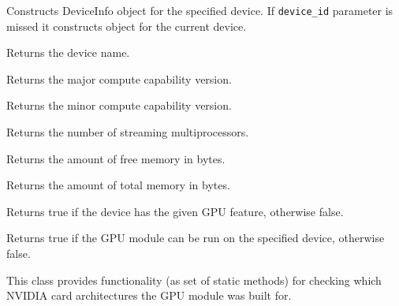 Constructs DeviceInfo object for the specified device. If \texttt{device\_id} parameter is missed it constructs object for the current device.

\begin{description}
\end{description}


Returns the device name.



Returns the major compute capability version.



Returns the minor compute capability version.



Returns the number of streaming multiprocessors.



Returns the amount of free memory in bytes.



Returns the amount of total memory in bytes.



Returns true if the device has the given GPU feature, otherwise false.

\begin{description}
\end{description}


Returns true if the GPU module can be run on the specified device, otherwise false.



This class provides functionality (as set of static methods) for checking which NVIDIA card architectures the GPU module was built for.

